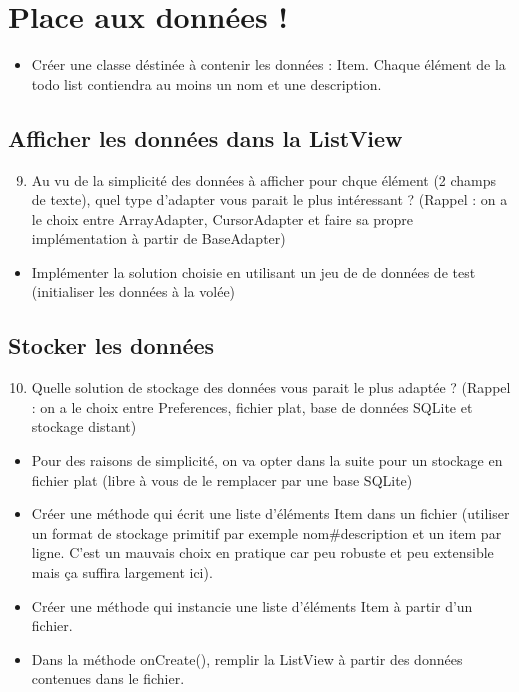 \documentclass{article}
\begin{document}
 \section{Place aux données !}
 \begin{itemize}
  \item Créer une classe déstinée à contenir les données : Item. Chaque élément de la todo list contiendra au moins un nom et une description.
 \end{itemize}
 \subsection{Afficher les données dans la ListView}
   \begin{enumerate}
 \setcounter{enumi}{8}
\item Au vu de la simplicité des données à afficher pour chque élément (2 champs de texte), quel type d'adapter vous parait le plus intéressant ? 
(Rappel : on a le choix entre ArrayAdapter, CursorAdapter et faire sa propre implémentation à partir de BaseAdapter)
\end{enumerate}
 \begin{itemize}
  \item Implémenter la solution choisie en utilisant un jeu de de données de test (initialiser les données à la volée)
 \end{itemize}
  \subsection{Stocker les données}
  \begin{enumerate}
 \setcounter{enumi}{9}
\item Quelle solution de stockage des données vous parait le plus adaptée ? (Rappel : on a le choix entre Preferences, fichier plat, base de données SQLite et stockage distant)
\end{enumerate}
 \begin{itemize}
  \item Pour des raisons de simplicité, on va opter dans la suite pour un stockage en fichier plat (libre à vous de le remplacer par une base SQLite)
  \item Créer une méthode qui écrit une liste d'éléments Item dans un fichier (utiliser un format de stockage primitif par exemple nom#description et un item par ligne. C'est un mauvais choix en pratique car peu robuste et peu extensible mais ça suffira largement ici).
  \item Créer une méthode qui instancie une liste d'éléments Item à partir d'un fichier.
  \item Dans la méthode onCreate(), remplir la ListView à partir des données contenues dans le fichier.
 \end{itemize}
\end{document}
